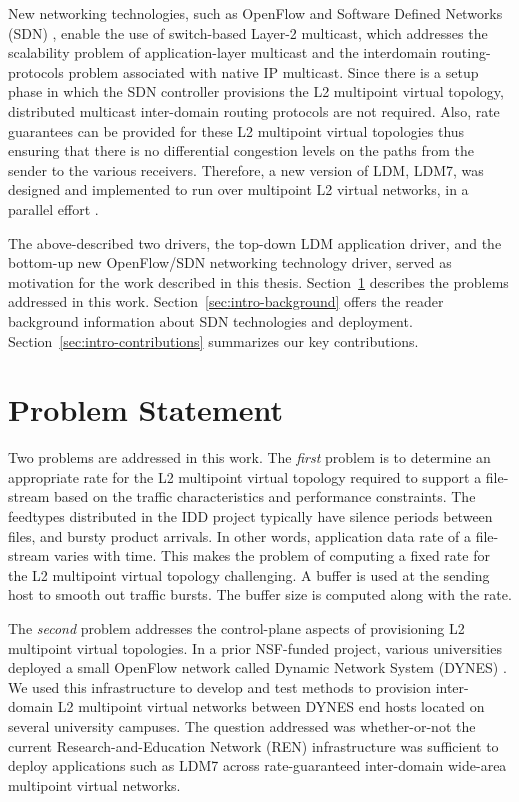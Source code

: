 New networking technologies, such as OpenFlow and Software Defined Networks (SDN) \cite{SDNs}, enable the use of switch-based Layer-2 multicast, which addresses the scalability problem of application-layer multicast and
the interdomain routing-protocols problem associated with native IP multicast. Since there is a setup phase in which the SDN controller provisions the L2 multipoint virtual topology, distributed multicast inter-domain routing protocols are not required. Also, rate guarantees can be provided for these L2 multipoint virtual topologies thus ensuring that there is no differential congestion levels on the paths from the sender to the various receivers. Therefore, a new version of LDM,
LDM7, was designed and implemented to run over multipoint L2 virtual networks, in a parallel effort 
\cite{chen2016file}.

The above-described two drivers, the top-down LDM application driver, and the bottom-up new OpenFlow/SDN networking technology driver, served as motivation for the work described in this thesis.
Section~\ref{sec:intro-problem} describes the problems addressed in this work.
Section~\ref{sec:intro-background} offers the reader background information about SDN technologies
and deployment.
Section~\ref{sec:intro-contributions} summarizes our key contributions.

\section{Problem Statement}
\label{sec:intro-problem}

Two problems are addressed in this work. The \emph{first} problem is to 
determine an appropriate rate for the L2 multipoint virtual topology required to support a file-stream
based on the traffic characteristics and performance constraints. The feedtypes distributed
in the IDD project typically have silence periods between files, and bursty product arrivals.
In other words, application data rate of a file-stream varies with time. This makes the problem of
computing a fixed rate for the L2 multipoint virtual topology challenging. A buffer is used at the
sending host to smooth out traffic bursts. The buffer size is computed along with the rate.

The \emph{second} problem addresses the control-plane aspects of provisioning L2 multipoint virtual
topologies. In a prior NSF-funded project, various universities deployed a small OpenFlow network called
Dynamic Network System (DYNES) \cite{1742-6596-396-4-042065}. We used this infrastructure to develop and test methods to provision inter-domain L2 multipoint virtual networks between DYNES end hosts located on several university campuses. The question addressed was whether-or-not the current Research-and-Education Network (REN) 
infrastructure was sufficient
to deploy applications such as LDM7 across rate-guaranteed inter-domain wide-area multipoint virtual networks.

